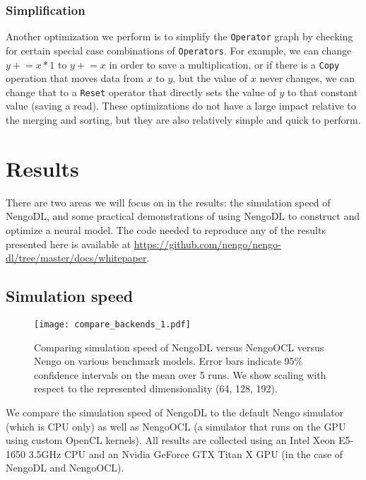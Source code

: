 \documentclass{article}
\begin{document}
\subsubsection{Simplification}

Another optimization we perform is to simplify the \texttt{Operator} graph by checking for certain special case combinations of \texttt{Operators}.  For example, we can change $y\mathrel{+}=x*1$ to $y\mathrel{+}=x$ in order to save a multiplication, or if there is a \texttt{Copy} operation that moves data from $x$ to $y$, but the value of $x$ never changes, we can change that to a \texttt{Reset} operator that directly sets the value of $y$ to that constant value (saving a read).  These optimizations do not have a large impact relative to the merging and sorting, but they are also relatively simple and quick to perform.

\section{Results}
\label{sec:results}

There are two areas we will focus on in the results: the simulation speed of NengoDL, and some practical demonstrations of using NengoDL to construct and optimize a neural model.  The code needed to reproduce any of the results presented here is available at \url{https://github.com/nengo/nengo-dl/tree/master/docs/whitepaper}. 

\subsection{Simulation speed}
\label{sec:simulation_speed}

\begin{figure}
\centering
\texttt{[image: compare\_backends\_1.pdf]}
\caption{Comparing simulation speed of NengoDL versus NengoOCL versus Nengo on various benchmark models.  Error bars indicate 95\% confidence intervals on the mean over 5 runs.  We show scaling with respect to the represented dimensionality (64, 128, 192).}
\label{fig:compare_backends_1}
\end{figure}

We compare the simulation speed of NengoDL to the default Nengo simulator (which is CPU only) as well as NengoOCL (a simulator that runs on the GPU using custom OpenCL kernels).  All results are collected using an Intel Xeon E5-1650 3.5GHz CPU and an Nvidia GeForce GTX Titan X GPU (in the case of NengoDL and NengoOCL).
\end{document}
